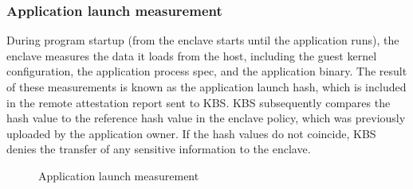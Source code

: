 \subsubsection{Application launch measurement}
During program startup (from the enclave starts until the application runs), the enclave measures the data it loads from the host, including the guest kernel configuration, the application process spec, and the application binary. The result 
of these measurements is known as the application launch hash, which is included in the remote attestation report sent to KBS. KBS subsequently compares the hash value to the reference hash value in the enclave policy, which was previously uploaded 
by the application owner. If the hash values do not coincide, KBS denies the transfer of any sensitive information to the enclave.
\begin{figure}[H]

    
    
    \caption[Application launch measurement demo]{Application launch measurement}
    \label{fig:cquark_launch_measurement}
\end{figure}

